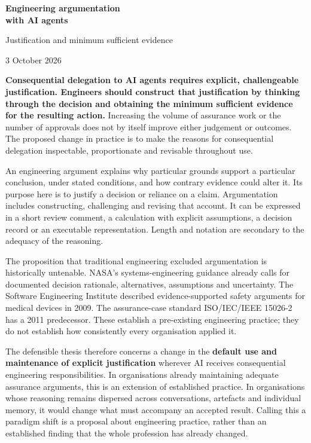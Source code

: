 \documentclass[11pt,a4paper]{article}
\begin{document}
{\fontsize{22}{26}\selectfont\bfseries Engineering argumentation\\with AI agents\par}
\vspace{4pt}
{\large Justification and minimum sufficient evidence\par}
\vspace{5pt}
{\small 3 October 2026\par}
\vspace{10pt}
\textbf{Consequential delegation to AI agents requires explicit, challengeable justification. Engineers should construct that justification by thinking through the decision and obtaining the minimum sufficient evidence for the resulting action.} Increasing the volume of assurance work or the number of approvals does not by itself improve either judgement or outcomes. The proposed change in practice is to make the reasons for consequential delegation inspectable, proportionate and revisable throughout use.

An engineering argument explains why particular grounds support a particular conclusion, under stated conditions, and how contrary evidence could alter it. Its purpose here is to justify a decision or reliance on a claim. Argumentation includes constructing, challenging and revising that account. It can be expressed in a short review comment, a calculation with explicit assumptions, a decision record or an executable representation. Length and notation are secondary to the adequacy of the reasoning.

The proposition that traditional engineering excluded argumentation is historically untenable. NASA's systems-engineering guidance already calls for documented decision rationale, alternatives, assumptions and uncertainty. The Software Engineering Institute described evidence-supported safety arguments for medical devices in 2009. The assurance-case standard ISO/IEC/IEEE 15026-2 has a 2011 predecessor. These establish a pre-existing engineering practice; they do not establish how consistently every organisation applied it.\cite{nasa,sei,standard}

The defensible thesis therefore concerns a change in the \textbf{default use and maintenance of explicit justification} wherever AI receives consequential engineering responsibilities. In organisations already maintaining adequate assurance arguments, this is an extension of established practice. In organisations whose reasoning remains dispersed across conversations, artefacts and individual memory, it would change what must accompany an accepted result. Calling this a paradigm shift is a proposal about engineering practice, rather than an established finding that the whole profession has already changed.
\end{document}
